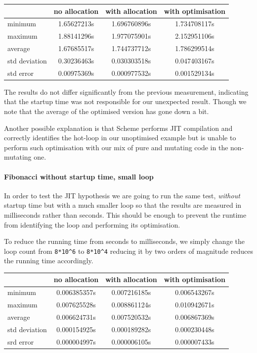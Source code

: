 \documentclass[
]{article}
\begin{document}
\begin{tabular}{ l | c c c }
          & no allocation & with allocation & with optimisation\\
\hline 
  minimum       & 1.65627213s & 1.696760896s & 1.734708117s \\
  maximum       & 1.88141296s & 1.977075901s & 2.152951106s \\ 
  average       & 1.67685517s & 1.744737712s & 1.786299514s  \\
  std deviation & 0.30236463s & 0.030303518s & 0.047403167s \\
  std error     & 0.00975369s & 0.000977532s & 0.001529134s \\
\end{tabular}

The results do not differ significantly from the previous measurement,
indicating that the startup time was not responsible for our unexpected
result. Though we note that the average of the optimised version has
gone down a bit.

Another possible explanation is that Scheme performs JIT compilation and
correctly identifies the hot-loop in our unoptimised example but is
unable to perform such optimisation with our mix of pure and mutating
code in the non-mutating one.

\hypertarget{fibonacci-without-startup-time-small-loop}{%
\paragraph{Fibonacci without startup time, small
loop}\label{fibonacci-without-startup-time-small-loop}}

In order to test the JIT hypothesis we are going to run the same test,
\emph{without} startup time but with a much smaller loop so that the
results are measured in milliseconds rather than seconds. This should be
enough to prevent the runtime from identifying the loop and performing
its optimisation.

To reduce the running time from seconds to milliseconds, we simply
change the loop count from \texttt{8*10\^{}6} to \texttt{8*10\^{}4}
reducing it by two orders of magnitude reduces the running time
accordingly.

\begin{tabular}{ l | c c c }
          & no allocation & with allocation & with optimisation\\
\hline 
  minimum       & 0.006385357s & 0.007216185s & 0.006543267s \\
  maximum       & 0.007625528s & 0.008861124s & 0.010942671s \\ 
  average       & 0.006624731s & 0.007520532s & 0.006867369s \\
  std deviation & 0.000154925s & 0.000189282s & 0.000230448s \\
  srd error     & 0.000004997s & 0.000006105s & 0.000007433s \\\end{tabular}
\end{document}
